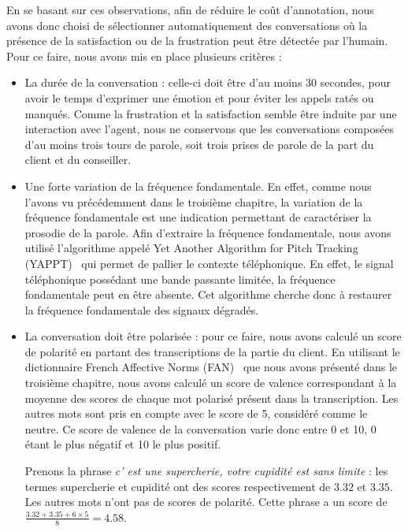 En se basant sur ces observations, afin de réduire le coût d'annotation, nous avons donc choisi de sélectionner automatiquement des conversations où la présence de la satisfaction ou de la frustration peut être détectée par l'humain. Pour ce faire, nous avons mis en place plusieurs critères :
\begin{itemize}
  \item La durée de la conversation : celle-ci doit être d'au moins 30 secondes, pour avoir le temps d'exprimer une émotion et pour éviter les appels ratés ou manqués. Comme la frustration et la satisfaction semble être induite par une interaction avec l'agent, nous ne conservons que les conversations composées d'au moins trois tours de parole, soit trois prises de parole de la part du client et du conseiller.
  \item Une forte variation de la fréquence fondamentale. En effet, comme nous l'avons vu précédemment dans le troisième chapitre, la variation de la fréquence fondamentale est une indication permettant de caractériser la prosodie de la parole. Afin d'extraire la fréquence fondamentale, nous avons utilisé l'algorithme appelé Yet Another Algorithm for Pitch Tracking (YAPPT)~\cite{Zahorian2008} qui permet de pallier le contexte téléphonique. En effet, le signal téléphonique possédant une bande passante limitée, la fréquence fondamentale peut en être absente. Cet algorithme cherche donc à restaurer la fréquence fondamentale des signaux dégradés.
  \item La conversation doit être polarisée : pour ce faire, nous avons calculé un score de polarité en partant des transcriptions de la partie du client. En utilisant le dictionnaire French Affective Norms (FAN)~\cite{Monnier2014} que nous avons présenté dans le troisième chapitre, nous avons calculé un score de valence correspondant à la moyenne des scores de chaque mot polarisé présent dans la transcription. Les autres mots sont pris en compte avec le score de 5, considéré comme le neutre. Ce score de valence de la conversation varie donc entre 0 et 10, 0 étant le plus négatif et 10 le plus positif.

  Prenons la phrase \textit{c' est une supercherie, votre cupidité est sans limite} : les termes supercherie et cupidité ont des scores respectivement de $3.32$ et $3.35$. Les autres mots n'ont pas de scores de polarité. Cette phrase a un score de $\frac{3.32+3.35+6\times5}{8}=4.58$.
\end{itemize}



